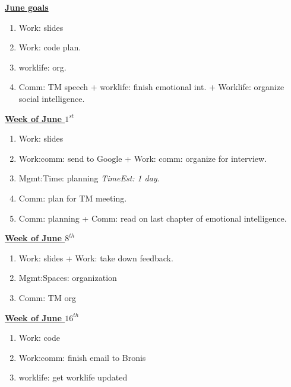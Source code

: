 \documentclass[serif, mathserif, final]{beamer}
\newcommand{\te}[1]{\textit{TimeEst:} \textit{#1}}
\begin{document}
\begin{frame}{}
\begin{columns}
\begin{column}{0.5\linewidth}
\begin{block}{\underline{\textbf{June goals}}} 
\begin{enumerate} 
  \small \item \small Work: slides 
  \small \item \small Work: code plan. 
  \item \small worklife: org. 
  \item \small Comm: TM speech + worklife: finish emotional int. + Worklife: organize
    social intelligence. 
\end{enumerate}
\end{block}

\begin{block}{\small \underline{\textbf{Week of June $1^{st}$}}}
\begin{enumerate}
\tiny \item \tiny Work: slides 
\item \tiny Work:comm: send to Google + Work: comm: organize for interview.
\item \tiny Mgmt:Time: planning \te{1 day}. 
\item \tiny Comm: plan for TM meeting.
\item \tiny Comm: planning + Comm: read on last chapter of emotional intelligence. 
\end{enumerate}
\end{block}


\begin{block}{\small \underline{\textbf{Week of June $8^{th}$}}}
\begin{enumerate}
\tiny \item \tiny Work: slides + Work: take down feedback. 
\item \tiny Mgmt:Spaces: organization
\item \tiny Comm: TM org 
\end{enumerate}
\end{block}

\begin{block}{\small \underline{\textbf{Week of June $16^{th}$}}}
\begin{enumerate}
\tiny \item \tiny Work: code
\item \tiny Work:comm: finish email to Bronis
\item \tiny worklife: get worklife updated 


\end{enumerate}
\end{block}
\end{column}
\end{columns}
\end{frame}
\end{document}
